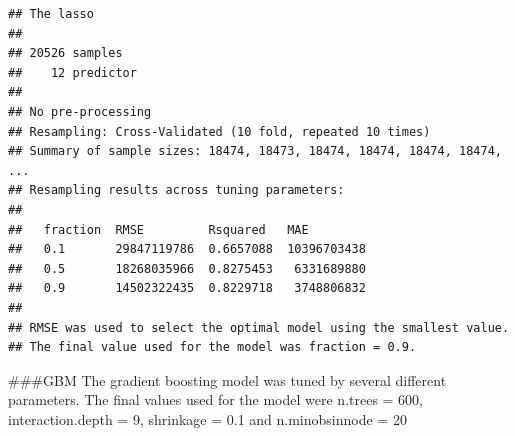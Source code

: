 \documentclass[11pt,]{article}
\newenvironment{Shaded}{\begin{snugshade}}{\end{snugshade}}
\newcommand{\KeywordTok}[1]{\textcolor[rgb]{0.13,0.29,0.53}{\textbf{#1}}}
\newcommand{\NormalTok}[1]{#1}
\newcommand{\OperatorTok}[1]{\textcolor[rgb]{0.81,0.36,0.00}{\textbf{#1}}}
\newcommand{\StringTok}[1]{\textcolor[rgb]{0.31,0.60,0.02}{#1}}
\begin{document}
\begin{verbatim}
## The lasso 
## 
## 20526 samples
##    12 predictor
## 
## No pre-processing
## Resampling: Cross-Validated (10 fold, repeated 10 times) 
## Summary of sample sizes: 18474, 18473, 18474, 18474, 18474, 18474, ... 
## Resampling results across tuning parameters:
## 
##   fraction  RMSE         Rsquared   MAE        
##   0.1       29847119786  0.6657088  10396703438
##   0.5       18268035966  0.8275453   6331689880
##   0.9       14502322435  0.8229718   3748806832
## 
## RMSE was used to select the optimal model using the smallest value.
## The final value used for the model was fraction = 0.9.
\end{verbatim}

\#\#\#GBM The gradient boosting model was tuned by several different
parameters. The final values used for the model were n.trees = 600,
interaction.depth = 9, shrinkage = 0.1 and n.minobsinnode = 20

\begin{Shaded}
\end{Shaded}
\end{document}
